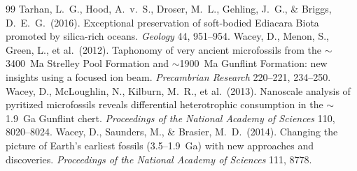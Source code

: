 \documentclass[11pt]{article}
\begin{document}
\begin{thebibliography}{99}
 Tarhan, L.~G., Hood, A.~v.~S., Droser, M.~L., Gehling, J.~G.,
\& Briggs, D.~E.~G.\ (2016). Exceptional preservation of soft-bodied Ediacara Biota promoted by
silica-rich oceans. \textit{Geology} 44, 951--954.
 Wacey, D., Menon, S., Green, L., et al.\ (2012). Taphonomy of
very ancient microfossils from the $\sim$3400~Ma Strelley Pool Formation and $\sim$1900~Ma Gunflint
Formation: new insights using a focused ion beam. \textit{Precambrian Research} 220--221, 234--250.
 Wacey, D., McLoughlin, N., Kilburn, M.~R., et al.\ (2013).
Nanoscale analysis of pyritized microfossils reveals differential heterotrophic consumption in the
$\sim$1.9~Ga Gunflint chert. \textit{Proceedings of the National Academy of Sciences} 110,
8020--8024.
 Wacey, D., Saunders, M., \& Brasier, M.~D.\ (2014).
Changing the picture of Earth's earliest fossils (3.5--1.9~Ga) with new approaches and discoveries.
\textit{Proceedings of the National Academy of Sciences} 111, 8778.
\end{thebibliography}
\end{document}
